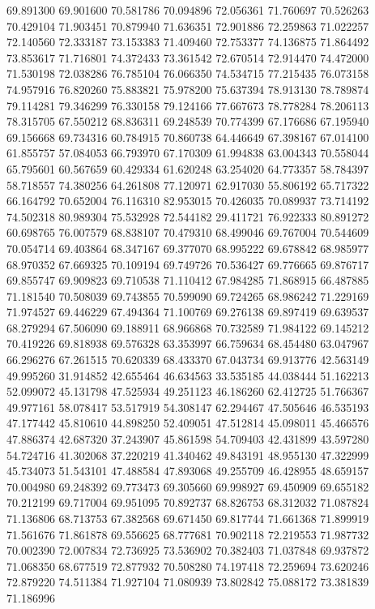 69.891300
69.901600
70.581786
70.094896
72.056361
71.760697
70.526263
70.429104
71.903451
70.879940
71.636351
72.901886
72.259863
71.022257
72.140560
72.333187
73.153383
71.409460
72.753377
74.136875
71.864492
73.853617
71.716801
74.372433
73.361542
72.670514
72.914470
74.472000
71.530198
72.038286
76.785104
76.066350
74.534715
77.215435
76.073158
74.957916
76.820260
75.883821
75.978200
75.637394
78.913130
78.789874
79.114281
79.346299
76.330158
79.124166
77.667673
78.778284
78.206113
78.315705
67.550212
68.836311
69.248539
70.774399
67.176686
67.195940
69.156668
69.734316
60.784915
70.860738
64.446649
67.398167
67.014100
61.855757
57.084053
66.793970
67.170309
61.994838
63.004343
70.558044
65.795601
60.567659
60.429334
61.620248
63.254020
64.773357
58.784397
58.718557
74.380256
64.261808
77.120971
62.917030
55.806192
65.717322
66.164792
70.652004
76.116310
82.953015
70.426035
70.089937
73.714192
74.502318
80.989304
75.532928
72.544182
29.411721
76.922333
80.891272
60.698765
76.007579
68.838107
70.479310
68.499046
69.767004
70.544609
70.054714
69.403864
68.347167
69.377070
68.995222
69.678842
68.985977
68.970352
67.669325
70.109194
69.749726
70.536427
69.776665
69.876717
69.855747
69.909823
69.710538
71.110412
67.984285
71.868915
66.487885
71.181540
70.508039
69.743855
70.599090
69.724265
68.986242
71.229169
71.974527
69.446229
67.494364
71.100769
69.276138
69.897419
69.639537
68.279294
67.506090
69.188911
68.966868
70.732589
71.984122
69.145212
70.419226
69.818938
69.576328
63.353997
66.759634
68.454480
63.047967
66.296276
67.261515
70.620339
68.433370
67.043734
69.913776
42.563149
49.995260
31.914852
42.655464
46.634563
33.535185
44.038444
51.162213
52.099072
45.131798
47.525934
49.251123
46.186260
62.412725
51.766367
49.977161
58.078417
53.517919
54.308147
62.294467
47.505646
46.535193
47.177442
45.810610
44.898250
52.409051
47.512814
45.098011
45.466576
47.886374
42.687320
37.243907
45.861598
54.709403
42.431899
43.597280
54.724716
41.302068
37.220219
41.340462
49.843191
48.955130
47.322999
45.734073
51.543101
47.488584
47.893068
49.255709
46.428955
48.659157
70.004980
69.248392
69.773473
69.305660
69.998927
69.450909
69.655182
70.212199
69.717004
69.951095
70.892737
68.826753
68.312032
71.087824
71.136806
68.713753
67.382568
69.671450
69.817744
71.661368
71.899919
71.561676
71.861878
69.556625
68.777681
70.902118
72.219553
71.987732
70.002390
72.007834
72.736925
73.536902
70.382403
71.037848
69.937872
71.068350
68.677519
72.877932
70.508280
74.197418
72.259694
73.620246
72.879220
74.511384
71.927104
71.080939
73.802842
75.088172
73.381839
71.186996
